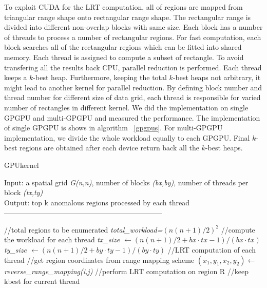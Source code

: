 \documentclass[AMA,LATO1COL]{WileyNJD-v2}
\newcommand{\gpu}{\textsc{GPU}}
\begin{document}
To exploit CUDA for the LRT computation, all of regions are mapped from triangular range shape onto rectangular range shape. The rectangular range is divided into different non-overlap blocks with same size. Each block has a number of threads to process a number of rectangular regions. For fast computation, each block searches all of the rectangular regions which can be fitted into shared memory. Each thread is assigned to compute a subset of rectangle. To avoid transfering all the results back CPU, parallel reduction is performed. Each thread keeps a $k$-best heap. Furthermore, keeping the total $k$-best heaps not arbitrary, it might lead  to another kernel for parallel reduction. By defining block number and thread number for different size of data grid, each thread is responsible for varied number of rectangles in different kernel. We did the implementation on single GPGPU and multi-GPGPU and measured the performance.  The implementation of single GPGPU is shows in algorithm ~\ref{gpgpus}. For multi-GPGPU implementation, we divide the whole workload equally to each GPGPU. Final $k$-best regions are obtained after each device return back all the $k$-best heaps.

\begin{algorithm}[t!]
\label{al}
\caption{ \gpu kernel}\label{gpgpus}
Input: a spatial grid \textit{G(n,n)}, number of blocks \textit{(bx,by)}, number of threads per block \textit{(tx,ty)}\\
Output: top k anomalous regions processed by each thread\\
------------------------------------------------------------------ \\
\begin{algorithmic}[1]
\State //total regions to be enumerated
\State \textit {total\_workload=$(n(n+1)/2)^2$}
\State //compute the workload for each thread
\State \textit {tx\_size \(\leftarrow\)$(n(n+1)/2 +bx \cdot tx -1)/(bx\cdot tx)$ }
\State \textit {ty\_size \(\leftarrow\)$(n(n+1)/2 +by \cdot ty-1)/(by \cdot ty)$ }
\State //LRT computation of each thread
\State //get region coordinates from range mapping scheme
\State \textit { $(x_1,y_1,x_2,y_2)$\(\leftarrow\)reverse\_range\_mapping(i,j)}
\State //perform LRT computation on region R
\State //keep kbest for current thread

\EndFor
\EndFor
\end{algorithmic}
\end{algorithm}
\end{document}
